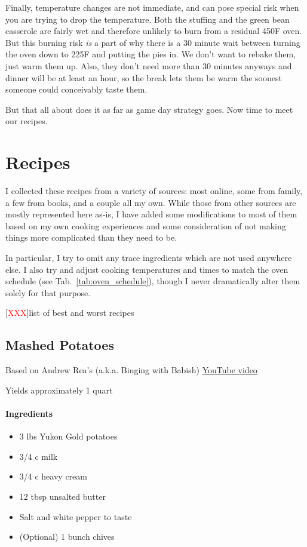 \documentclass[12pt]{article}
\newcommand{\TODO}{[\textcolor{red}{XXX}]}
\newenvironment*{ingredients}
	{
		\paragraph*{Ingredients}
		\begin{itemize}
	}
	{
		\end{itemize}
	}
\begin{document}
	Finally, temperature changes are not immediate, and can pose special risk when you are trying to drop the temperature. Both the stuffing and the green bean casserole are fairly wet and therefore unlikely to burn from a residual 450F oven. But this burning risk \textit{is} a part of why there is a 30 minute wait between turning the oven down to 225F and putting the pies in. We don't want to rebake them, just warm them up. Also, they don't need more than 30 minutes anyways and dinner will be at least an hour, so the break lets them be warm the soonest someone could conceivably taste them.
	
	But that all about does it as far as game day strategy goes. Now time to meet our recipes.
	
	\newpage
	
	\section{Recipes}
	I collected these recipes from a variety of sources: most online, some from family, a few from books, and a couple all my own. While those from other sources are mostly represented here as-is, I have added some modifications to most of them based on my own cooking experiences and some consideration of not making things more complicated than they need to be.
	
	In particular, I try to omit any trace ingredients which are not used anywhere else. I also try and adjust cooking temperatures and times to match the oven schedule (see Tab.~\ref{tab:oven_schedule}), though I never dramatically alter them solely for that purpose.
	
	\TODO list of best and worst recipes
	
	\newpage
	
	\subsection{Mashed Potatoes}
	Based on Andrew Rea's (a.k.a. Binging with Babish) \href{https://youtu.be/ZLnWdPPJvYg?si=7kN4RYZfTfVTtFed}{YouTube video}
	
	Yields approximately 1 quart
	
	\begin{ingredients}
		\item 3 lbs Yukon Gold potatoes
		\item 3/4 c milk
		\item 3/4 c heavy cream
		\item 12 tbsp unsalted butter
		\item Salt and white pepper to taste
		\item (Optional) 1 bunch chives
	\end{ingredients}
	
\end{document}

